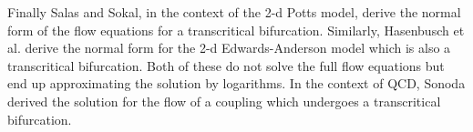 \documentclass[
 reprint,
 amsmath,amssymb,
 aps, superscriptaddress, pre
]{revtex4-1}
\begin{document}







Finally Salas and Sokal, in the context of the 2-d Potts model, derive the normal form of the flow equations for a transcritical bifurcation. Similarly, Hasenbusch et al. derive the normal form for the 2-d Edwards-Anderson model which is also a transcritical bifurcation. Both of these do not solve the full flow equations but end up approximating the solution by logarithms. In the context of QCD, Sonoda derived the solution for the flow of a coupling which undergoes a transcritical bifurcation. 
\end{document}
